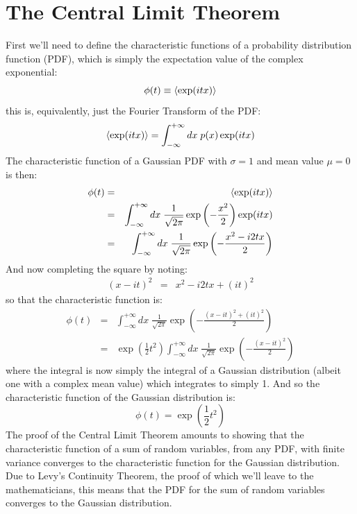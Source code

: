 \documentclass[12pt,oneside]{book}
\begin{document}
\chapter{The Central Limit Theorem}

First we'll need to define the characteristic functions of a probability distribution function (PDF), which is simply the expectation value of the complex exponential:
\begin{equation*}   
\phi(t) \equiv \braket{\exp(itx)}  
\end{equation*}  
this is, equivalently, just the Fourier Transform of the PDF:
\begin{equation*}
\braket{\exp(itx)} = \int_{-\infty}^{+\infty} dx \; p(x) \exp(itx)
\end{equation*}
The characteristic function of a Gaussian PDF with $\sigma=1$ and mean value $\mu=0$ is then:
\begin{eqnarray*}
\phi(t) &=& \braket{\exp(itx)}\\
&=& \int_{-\infty}^{+\infty} dx \; \frac{1}{\sqrt{2\pi}} \exp\left(-\frac{x^2}{2}\right)\exp(itx)\\
&=& \int_{-\infty}^{+\infty} dx \; \frac{1}{\sqrt{2\pi}} \exp\left(-\frac{x^2-i2tx}{2}\right)
\end{eqnarray*}
And now completing the square by noting:
\begin{eqnarray*}
(x-it)^2 &=& x^2 - i2tx + (it)^2 
\end{eqnarray*}
so that the characteristic function is:
\begin{eqnarray*}
\phi(t) &=& \int_{-\infty}^{+\infty} dx \; \frac{1}{\sqrt{2\pi}} \exp\left(-\frac{(x-it)^2+(it)^2}{2}\right)\\
&=& \exp\left(\frac{1}{2}t^2\right)\int_{-\infty}^{+\infty} dx \; \frac{1}{\sqrt{2\pi}} \exp\left(-\frac{(x-it)^2}{2}\right)
\end{eqnarray*}   
where the integral is now simply the integral of a Gaussian distribution (albeit one with a complex mean value) which integrates to simply 1.  And so the characteristic function of the Gaussian distribution is:
\begin{equation}
\phi(t) = \exp\left(\frac{1}{2}t^2\right) \label{eqn:cfn}
\end{equation}
 The proof of the Central Limit Theorem amounts to showing that the characteristic function of a sum of random variables, from any PDF, with finite variance converges to the characteristic function for the Gaussian distribution.  Due to Levy's Continuity Theorem, the proof of which we'll leave to the mathematicians, this means that the PDF for the sum of random variables converges to the Gaussian distribution.
\end{document}
